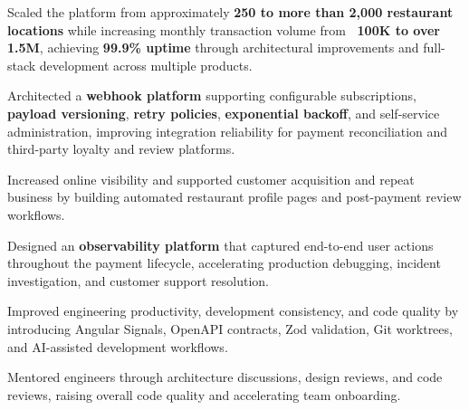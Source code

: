 \documentclass[10pt]{article}
\begin{document}
\begin{entryrow}
\begin{resumeitems}
    \item Scaled the platform from approximately \textbf{250 to more than 2,000 restaurant locations} while increasing monthly transaction volume from \textbf{~100K to over 1.5M}, achieving \textbf{99.9\% uptime} through architectural improvements and full-stack development across multiple products.
    \item Architected a \textbf{webhook platform} supporting configurable subscriptions, \textbf{payload versioning}, \textbf{retry policies}, \textbf{exponential backoff}, and self-service administration, improving integration reliability for payment reconciliation and third-party loyalty and review platforms.
    \item Increased online visibility and supported customer acquisition and repeat business by building automated restaurant profile pages and post-payment review workflows.

    \item Designed an \textbf{observability platform} that captured end-to-end user actions throughout the payment lifecycle, accelerating production debugging, incident investigation, and customer support resolution.

    \item Improved engineering productivity, development consistency, and code quality by introducing Angular Signals, OpenAPI contracts, Zod validation, Git worktrees, and AI-assisted development workflows.
    \item Mentored engineers through architecture discussions, design reviews, and code reviews, raising overall code quality and accelerating team onboarding.
  \end{resumeitems}
\end{entryrow}
\end{document}
